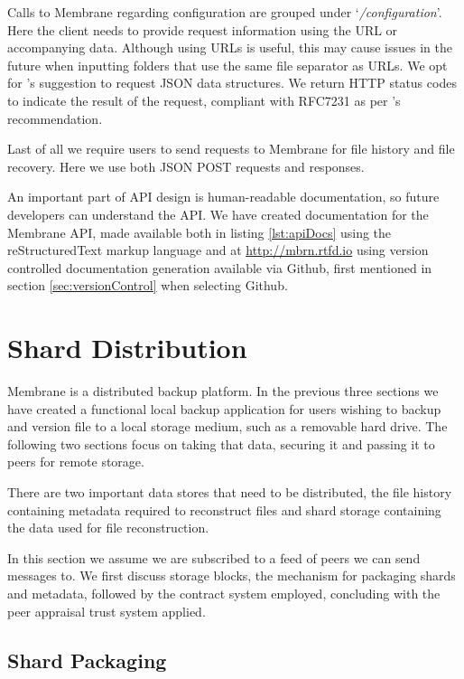 \documentclass[11pt, a4paper, twocolumn, twoside]{report}
\begin{document}
Calls to Membrane regarding configuration are grouped under `\emph{/configuration}'. Here the client needs to provide request information using the URL or accompanying data. Although using URLs is useful, this may cause issues in the future when inputting folders that use the same file separator as URLs. We opt for \cite{heroku2017api}'s suggestion to request JSON data structures. We return HTTP status codes to indicate the result of the request, compliant with RFC7231 \citep{fielding2014hypertext} as per \cite{google2017api}'s recommendation.

Last of all we require users to send requests to Membrane for file history and file recovery. Here we use both JSON POST requests and responses.

An important part of API design is human-readable documentation, so future developers can understand the API. \citep{heroku2017api} We have created documentation for the Membrane API, made available both in listing \ref{lst:apiDocs} using the reStructuredText markup language and at \url{http://mbrn.rtfd.io} using version controlled documentation generation available via Github, first mentioned in section \ref{sec:versionControl} when selecting Github.

\section{Shard Distribution}

Membrane is a distributed backup platform. In the previous three sections we have created a functional local backup application for users wishing to backup and version file to a local storage medium, such as a removable hard drive. The following two sections focus on taking that data, securing it and passing it to peers for remote storage.

There are two important data stores that need to be distributed, the file history containing metadata required to reconstruct files and shard storage containing the data used for file reconstruction.

In this section we assume we are subscribed to a feed of peers we can send messages to. We first discuss storage blocks, the mechanism for packaging shards and metadata, followed by the contract system employed, concluding with the peer appraisal trust system applied.

\subsection{Shard Packaging}
\end{document}
